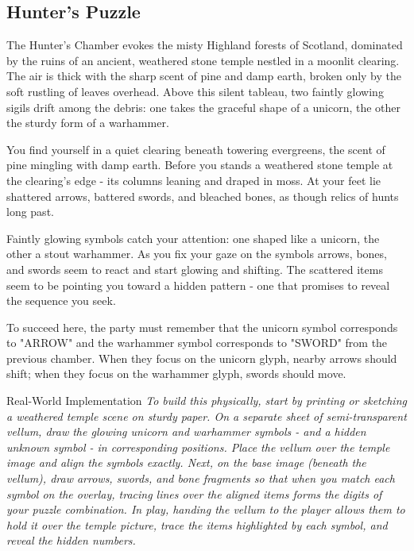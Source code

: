 \subsection*{Hunter's Puzzle}
{\entryfont The Hunter's Chamber evokes the misty Highland forests of Scotland, dominated by the ruins of an ancient, weathered stone temple nestled in a moonlit clearing. The air is thick with the sharp scent of pine and damp earth, broken only by the soft rustling of leaves overhead. Above this silent tableau, two faintly glowing sigils drift among the debris: one takes the graceful shape of a unicorn, the other the sturdy form of a warhammer.}
\begin{DndReadAloud}
	You find yourself in a quiet clearing beneath towering evergreens, the scent of pine mingling with damp earth. Before you stands a weathered stone temple at the clearing's edge - its columns leaning and draped in moss. At your feet lie shattered arrows, battered swords, and bleached bones, as though relics of hunts long past.

	Faintly glowing symbols catch your attention: one shaped like a unicorn, the other a stout warhammer. As you fix your gaze on the symbols arrows, bones, and swords seem to react and start glowing and shifting. The scattered items seem to be pointing you toward a hidden pattern - one that promises to reveal the sequence you seek.
\end{DndReadAloud}
{\noindent\entryfont To succeed here, the party must remember that the unicorn symbol corresponds to "ARROW" and the warhammer symbol corresponds to "SWORD" from the previous chamber. When they focus on the unicorn glyph, nearby arrows should shift; when they focus on the warhammer glyph, swords should move.}
\begingroup
	\DndSetThemeColor[DmgSlateGray]
	\begin{DndComment}{Real-World Implementation}
		\textit{To build this physically, start by printing or sketching a weathered temple scene on sturdy paper. On a separate sheet of semi-transparent vellum, draw the glowing unicorn and warhammer symbols - and a hidden unknown symbol - in corresponding positions. Place the vellum over the temple image and align the symbols exactly. Next, on the base image (beneath the vellum), draw arrows, swords, and bone fragments so that when you match each symbol on the overlay, tracing lines over the aligned items forms the digits of your puzzle combination. In play, handing the vellum to the player allows them to hold it over the temple picture, trace the items highlighted by each symbol, and reveal the hidden numbers.}
	\end{DndComment}
\endgroup

